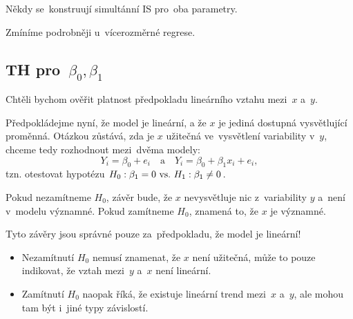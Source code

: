 \begin{remark}
	Někdy se~konstruují simultánní IS pro~oba parametry.

\begin{center}

\end{center}	
	
	 Zmíníme podrobněji u~vícerozměrné regrese.
\end{remark}


\subsection{TH pro~$\beta_0, \beta_1$ }

Chtěli bychom ověřit platnost předpokladu lineárního vztahu mezi~$x$ a~$y$.

Předpokládejme nyní, že model je lineární, a že $x$ je jediná dostupná vysvětlující proměnná. Otázkou zůstává, zda je $x$ užitečná ve~vysvětlení variability v~$y$, chceme tedy rozhodnout mezi~dvěma modely:
 $$
	Y_i = \beta_0 + e_i \quad \text{a} \quad Y_i = \beta_0 + \beta_1 x_i + e_i,
 $$
tzn. otestovat hypotézu $H_0: \beta_1 = 0 ~\text{vs.}~ H_1: \beta_1 \neq 0$.

Pokud nezamítneme $H_0$, závěr bude, že $x$ nevysvětluje nic z~variability $y$ a~není v~modelu významné. Pokud zamítneme $H_0$, znamená to, že $x$ je významné.

\begin{remark}
	Tyto závěry jsou správné pouze za~předpokladu, že model je lineární!
	\begin{itemize}
		\item Nezamítnutí $H_0$ nemusí znamenat, že $x$ není užitečná, může to pouze indikovat, že vztah mezi~$y$ a~$x$ není lineární.
		\item Zamítnutí $H_0$ naopak říká, že existuje lineární trend mezi~$x$ a~$y$, ale mohou tam být i~jiné typy závislostí.
	\end{itemize}
\end{remark}

